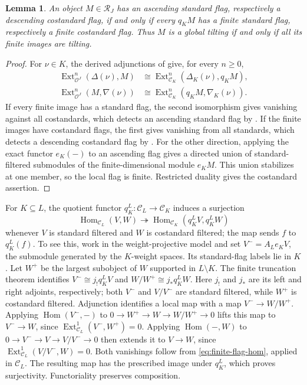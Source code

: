 \documentclass[11pt,reqno]{amsart}
\newcommand{\OO}{\mathcal O}\newcommand{\CC}{\mathscr C}\newcommand{\RR}{\mathcal R}\newcommand{\DD}{\mathcal D}
\newcommand{\Hom}{\operatorname{Hom}}\newcommand{\End}{\operatorname{End}}\newcommand{\Ext}{\operatorname{Ext}}
\newtheorem{lemma}[theorem]{Lemma}
\theoremstyle{definition}
\theoremstyle{remark}
\numberwithin{equation}{section}
\begin{document}
\begin{lemma}\label{lem:flag-detection}
An object $M\in\RR_J$ has an ascending standard flag, respectively a
descending costandard flag, if and only if every $q_KM$ has a finite
standard flag, respectively a finite costandard flag. Thus $M$ is a
global tilting if and only if all its finite images are tilting.
\end{lemma}
\begin{proof}
For $\nu\in K$, the derived adjunctions of
\cite[Theorem~3.42(3)--(6)]{BS} give, for every $n\geq0$,
\begin{align}
 \Ext^n_{\OO^J}(\Delta(\nu),M)
   &\cong\Ext^n_{\CC_K}(\Delta_K(\nu),q_KM),\label{eq:standard-adjunction}\\
 \Ext^n_{\OO^J}(M,\nabla(\nu))
   &\cong\Ext^n_{\CC_K}(q_KM,\nabla_K(\nu)).\label{eq:costandard-adjunction}
\end{align}
If every finite image has a standard flag, the second isomorphism
gives vanishing against all costandards, which detects an ascending
standard flag by \cite[Theorem~3.37]{BS}. If the finite images have
costandard flags, the first gives vanishing from all standards, which
detects a descending costandard flag by \cite[Theorem~3.39]{BS}.
For the other direction, applying the
exact functor $e_K(-)$ to an ascending flag gives a directed union of
standard-filtered submodules of the finite-dimensional module $e_KM$.
This union stabilizes at one member, so the local flag is finite.
Restricted duality gives the costandard assertion.
\end{proof}

For $K\subseteq L$, the quotient functor
$q_K^L:\CC_L\to\CC_K$ induces a surjection
\begin{equation}\label{eq:finite-hom-lift}
 \Hom_{\CC_L}(V,W)\twoheadrightarrow
 \Hom_{\CC_K}(q_K^LV,q_K^LW)
\end{equation}
whenever $V$ is standard filtered and $W$ is costandard filtered;
the map sends $f$ to $q_K^L(f)$.
To see this, work in the weight-projective model and set
$V^-=A_Le_KV$, the submodule generated by the $K$-weight spaces.
Its standard-flag labels lie in $K$. Let $W^+$ be the largest subobject of $W$ supported
in $L\setminus K$. The finite truncation theorem
\cite[Theorem~3.18 and Corollary~3.19]{BS} identifies
$V^-\cong j_!q_K^LV$ and $W/W^+\cong j_*q_K^LW$.
Here $j_!$ and $j_*$ are its left and right adjoints, respectively;
both $V^-$ and
$V/V^-$ are standard filtered, while $W^+$ is costandard filtered.
Adjunction identifies a local map with a map $V^-\to W/W^+$.
Applying $\Hom(V^-,-)$ to $0\to W^+\to W\to W/W^+\to0$ lifts
this map to $V^-\to W$, since
$\Ext^1_{\CC_L}(V^-,W^+)=0$.
Applying $\Hom(-,W)$ to $0\to V^-\to V\to V/V^-\to0$ then
extends it to $V\to W$, since
$\Ext^1_{\CC_L}(V/V^-,W)=0$.
Both vanishings follow from \eqref{eq:finite-flag-hom}, applied in
$\CC_L$. The resulting map has the prescribed image under $q_K^L$,
which proves surjectivity. Functoriality preserves composition.
\end{document}
